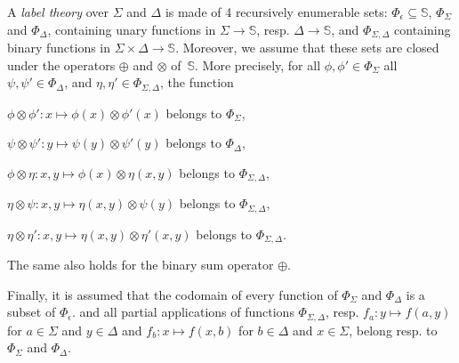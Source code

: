 \documentclass[runningheads]{llncs}
\newcommand{\Semiring}{\mathbb{S}}
\begin{document}
\noindent 
A \emph{label theory} over $\Sigma$ and $\Delta$
is made of 4 recursively enumerable sets:
$\Phi_\epsilon \subseteq \Semiring$, %
$\Phi_\Sigma$ and $\Phi_\Delta$, 
containing unary functions in $\Sigma \to \Semiring$, resp. $\Delta \to \Semiring$, 
and $\Phi_{\Sigma, \Delta}$  containing binary functions in $\Sigma \times \Delta \to \Semiring$.
Moreover, we assume that these sets are closed under the operators 
$\oplus$ and $\otimes$ of~$\Semiring$.
More precisely, for all $\phi, \phi' \in \Phi_\Sigma$ all 
$\psi, \psi' \in \Phi_\Delta$, 
and $\eta, \eta' \in \Phi_{\Sigma, \Delta}$, the function
\begin{description}
\item $\phi \otimes \phi' : x \mapsto \phi(x) \otimes \phi'(x)$ belongs to $\Phi_\Sigma$, 
\item $\psi \otimes \psi' : y \mapsto \psi(y) \otimes \psi'(y)$ belongs to $\Phi_\Delta$,
\item $\phi \otimes \eta : x, y \mapsto \phi(x) \otimes \eta(x, y)$ belongs to $\Phi_{\Sigma, \Delta}$,
\item $\eta \otimes \psi : x, y \mapsto \eta(x, y) \otimes \psi(y)$ belongs to $\Phi_{\Sigma, \Delta}$,
\item $\eta \otimes \eta' : x, y \mapsto \eta(x, y) \otimes \eta'(x, y)$ belongs to $\Phi_{\Sigma, \Delta}$.
\end{description}
The same also holds for the binary sum operator $\oplus$.

\noindent
{}
Finally, it is assumed that the codomain of every function of $\Phi_\Sigma$ and $\Phi_\Delta$
is a subset of $\Phi_\epsilon$.
and all partial applications of functions $\Phi_{\Sigma, \Delta}$, 
resp.  $f_a: y \mapsto f(a, y)$ for $a \in \Sigma$ and $y \in \Delta$
and  $f_b: x \mapsto f(x, b)$ for $b \in \Delta$ and $x \in \Sigma$, 
belong resp. to $\Phi_\Sigma$ and $\Phi_\Delta$.
\end{document}

